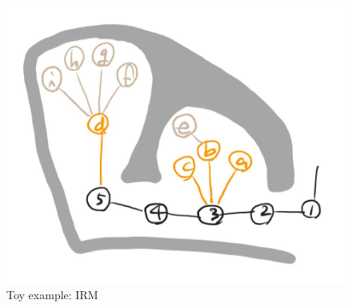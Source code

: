 \documentclass[letterpaper, 10 pt, conference]{ieeeconf}  %
\begin{document}

\begin{figure}[ht!]
  \centering
  \includegraphics[width=.7\columnwidth]{figures/bts_example/bts_irm.png}
  \caption{Toy example: IRM}
  \label{fig:bts_irm}
\end{figure}
\end{document}
